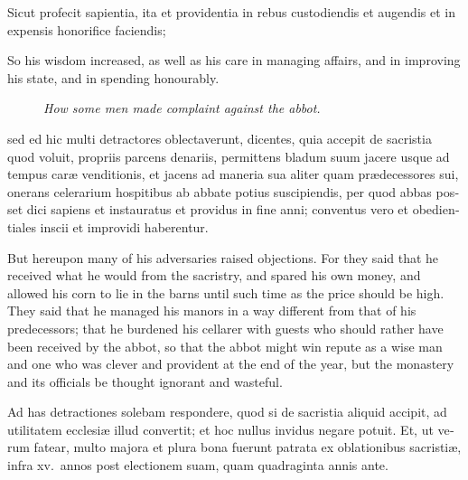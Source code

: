 \documentclass{book}
\newcommand{\blockhead}[4][]{
\begin{figure}
\centering
\vspace{#4}
\parbox{2.75cm}{\begin{center}\footnotesize \color{BrickRed} \emph{#2}\\ #1 \end{center}}
\end{figure}
}
\begin{document}
\begin{paracol}{2}
\switchcolumn*

\begin{otherlanguage}{latin}
Sicut profecit sapientia, ita et providentia in rebus custodiendis et augendis et in expensis honorifice faciendis;
\end{otherlanguage}

\switchcolumn

So his wisdom increased, as well as his care in managing affairs, and in improving his state, and in spending honourably.

\switchcolumn*

\begin{otherlanguage}{latin}
\blockhead{How some men made complaint against the abbot.}{4}{-0.45cm}
sed ed hic multi detractores oblectaverunt, dicentes, quia accepit de sacristia quod voluit, propriis parcens denariis, permittens bladum suum jacere usque ad tempus car\ae{} venditionis, et jacens ad maneria sua aliter quam pr\ae{}decessores sui, onerans celerarium hospitibus ab abbate potius suscipiendis, per quod abbas posset dici sapiens et instauratus et providus in fine anni; conventus vero et obedientiales inscii et improvidi haberentur.

\end{otherlanguage}

\switchcolumn

But hereupon many of his adversaries raised objections. For they said that he received what he would from the sacristry, and spared his own money, and allowed his corn to lie in the barns until such time as the price should be high. They said that he managed his manors in a way different from that of his predecessors; that he burdened his cellarer with guests who should rather have been received by the abbot, so that the abbot might win repute as a wise man and one who was clever and provident at the end of the year, but the monastery and its officials be thought ignorant and wasteful.

\switchcolumn*

\begin{otherlanguage}{latin}
Ad has detractiones solebam respondere, quod si de sacristia aliquid accipit, ad utilitatem ecclesi\ae{} illud convertit; et hoc nullus invidus negare potuit. Et, ut verum fatear, multo majora et plura bona fuerunt patrata ex oblationibus sacristi\ae{}, infra xv.\ annos post electionem suam, quam quadraginta annis ante.
\end{otherlanguage}

\switchcolumn


\end{paracol}
\end{document}
